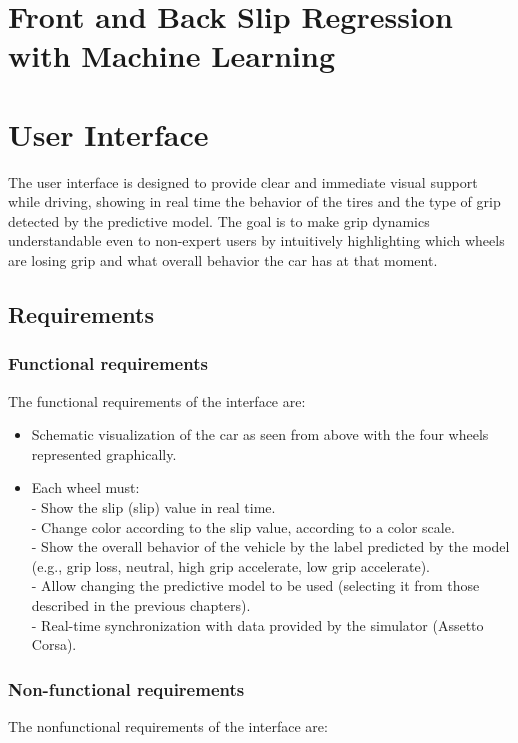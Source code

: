 \documentclass[a4paper,final,12pt]{report}
\begin{document}
\section{Front and Back Slip Regression with Machine Learning}


\newpage

\section{User Interface}
The user interface is designed to provide clear and immediate visual support while driving, showing in real time the behavior of the tires and the type of grip detected by the predictive model. The goal is to make grip dynamics understandable even to non-expert users by intuitively highlighting which wheels are losing grip and what overall behavior the car has at that moment.

\subsection{Requirements}

\subsubsection{Functional requirements}
The functional requirements of the interface are:
\begin{itemize}
    \item Schematic visualization of the car as seen from above with the four wheels represented graphically.

    \item  Each wheel must:\\
    - Show the slip (slip) value in real time.\\
    - Change color according to the slip value, according to a color scale.\\
    - Show the overall behavior of the vehicle by the label predicted by the model (e.g., grip loss, neutral, high grip accelerate, low grip accelerate).\\
    - Allow changing the predictive model to be used (selecting it from those described in the previous chapters).\\
    - Real-time synchronization with data provided by the simulator (Assetto Corsa).
\end{itemize}

\subsubsection{Non-functional requirements}
The nonfunctional requirements of the interface are:
\end{document}
